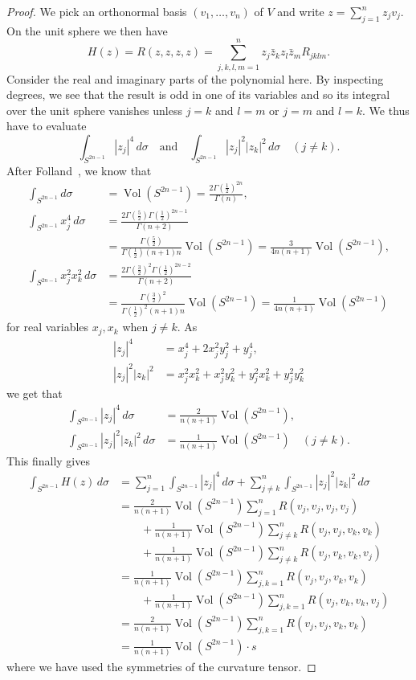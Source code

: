 \documentclass[10pt,a4paper]{article}
\newtheorem*{proof}{Proof}
\DeclareMathOperator{\Vol}{Vol}
\begin{document}
\begin{proof}
  We pick an orthonormal basis $(v_1,\ldots,v_n)$ of $V$ and write $z = \sum_{j=1}^n z_j v_j$. On the unit sphere we then have
$$
H(z)
= R(z,z,z,z)
= \sum_{j,k,l,m=1}^n z_j \bar z_k z_l \bar z_m R_{jklm}.
$$
Consider the real and imaginary parts of the polynomial here. By inspecting degrees, we see that the result is odd in one of its variables and so its integral over the unit sphere vanishes unless $j = k$ and $l = m$ or $j = m$ and $l = k$. We thus have to evaluate
$$
\int_{S^{2n-1}} |z_j|^4 \, d\sigma
\quad\text{and}\quad
\int_{S^{2n-1}} |z_j|^2 |z_k|^2 \, d\sigma
\quad(j \not= k).
$$
After Folland~\cite{folland}, we know that
\begin{align*}
\int_{S^{2n-1}} d\sigma
&= \Vol(S^{2n-1}) = \frac{2\Gamma(\tfrac12)^{2n}}{\Gamma(n)},
\\
\int_{S^{2n-1}} x_j^4 \, d\sigma
&= \frac{2\Gamma(\tfrac 52)\Gamma(\tfrac 12)^{2n-1}}{\Gamma(n+2)}
\\
&= \frac{\Gamma(\tfrac52)}{\Gamma(\tfrac12)(n+1)n} \Vol(S^{2n-1})
= \frac{3}{4n(n+1)} \Vol(S^{2n-1}),
\\
\int_{S^{2n-1}} x_j^2 x_k^2 \, d\sigma
&= \frac{2\Gamma(\tfrac32)^2\Gamma(\tfrac 12)^{2n-2}}{\Gamma(n+2)}
\\
&= \frac{\Gamma(\tfrac32)^2}{\Gamma(\tfrac12)^2 (n+1)n} \Vol(S^{2n-1})
= \frac{1}{4n(n+1)} \Vol(S^{2n-1})
\end{align*}
for real variables $x_j, x_k$ when $j \not= k$. As
\begin{align*}
|z_j|^4 &= x_j^4 + 2 x_j^2 y_j^2 + y_j^4,
\\
|z_j|^2 |z_k|^2 &= x_j^2 x_k^2 + x_j^2 y_k^2 + y_j^2 x_k^2 + y_j^2 y_k^2
\end{align*}
we get that
\begin{align*}
\int_{S^{2n-1}} |z_j|^4 \, d\sigma
&= \frac{2}{n(n+1)} \Vol(S^{2n-1}),
\\
\int_{S^{2n-1}} |z_j|^2 |z_k|^2 \, d\sigma
&= \frac{1}{n(n+1)} \Vol(S^{2n-1})
\quad(j \not= k).
\end{align*}
This finally gives
\begin{align*}
\int_{S^{2n-1}} H(z) \,d\sigma
&= \sum_{j=1}^n \int_{S^{2n-1}} |z_j|^4 \, d\sigma
+ \sum_{j \not= k}^n \int_{S^{2n-1}} |z_j|^2|z_k|^2 \, d\sigma
\\
&= \frac{2}{n(n+1)} \Vol(S^{2n-1}) \sum_{j=1}^n R(v_j,v_j,v_j,v_j)
\\
&\qquad{}+ \frac{1}{n(n+1)} \Vol(S^{2n-1}) \sum_{j \not= k}^n R(v_j,v_j,v_k,v_k)
\\
&\qquad{}+
\frac{1}{n(n+1)} \Vol(S^{2n-1}) \sum_{j \not= k}^n R(v_j,v_k,v_k,v_j)
\\
&= \frac{1}{n(n+1)} \Vol(S^{2n-1}) \sum_{j,k=1}^n R(v_j,v_j,v_k,v_k)
\\
&\qquad{}+
\frac{1}{n(n+1)} \Vol(S^{2n-1}) \sum_{j,k=1}^n R(v_j,v_k,v_k,v_j)
\\
&= \frac{2}{n(n+1)} \Vol(S^{2n-1}) \sum_{j,k=1}^n R(v_j,v_j,v_k,v_k)
\\
&= \frac{1}{n(n+1)} \Vol(S^{2n-1}) \cdot s
\end{align*}
where we have used the symmetries of the curvature tensor.
\end{proof}
\end{document}

